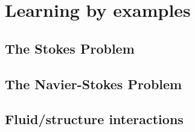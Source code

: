 %
%
%
%
%


\chapter{Learning by examples}
\label{cha:examples}


\section{The Stokes Problem}
\label{sec:stokesproblem}



\section{The Navier-Stokes Problem}
\label{sec:navierstokesproblem}



\section{Fluid/structure interactions}
\label{sec:gettingstarted}





%
%
